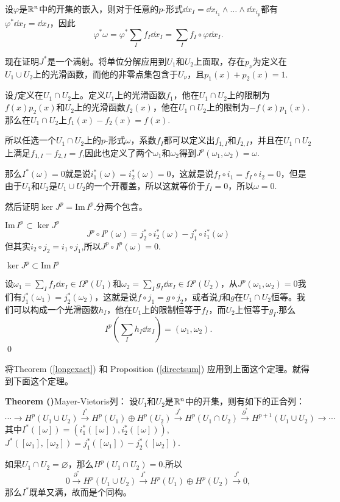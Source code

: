 \documentclass[9pt]{extbook}
\newcommand{\paracount}[1]{\refstepcounter{para}\textbf{#1 (\thepara)}}
\newcommand{\theo}{\paracount{Theorem}}
\newcommand{\pararef}[1]{(\ref{#1})}
\begin{document}
设$\varphi$是$\mathbb{R}^n$中的开集的嵌入，则对于任意的$p$-形式$\dd x_I=\dd x_{i_1}\wedge\dots\wedge\dd x_{i_p}$都有$\varphi^* \dd x_I =\dd x_I$，因此
\[
\varphi^*\omega=\varphi^*\sum_If_I\dd x_I=\sum_If_I\circ\varphi \dd x_I.
\]

现在证明$J^*$是一个满射。将单位分解应用到$U_1$和$U_2$上面取，存在$p_\nu$为定义在$U_1\cup U_2$上的光滑函数，而他的非零点集包含于$U_\nu$，且$p_1(x)+p_2(x)=1$.

设$f$定义在$U_1\cap U_2$上。定义$U_1$上的光滑函数$f_1$，他在$U_1\cap U_2$上的限制为$f(x)p_2(x)$和$U_2$上的光滑函数$f_2(x)$，他在$U_1\cap U_2$上的限制为$-f(x)p_1(x)$.那么在$U_1\cap U_2$上$f_1(x)-f_2(x)=f(x)$.

所以任选一个$U_1\cap U_2$上的$p$-形式$\omega$，系数$f_I$都可以定义出$f_{1,I}$和$f_{2,I}$，并且在$U_1\cap U_2$上满足$f_{1,I}-f_{2,I}=f$,因此也定义了两个$\omega_1$和$\omega_2$得到$J^p(\omega_1,\omega_2)=\omega$.

那么$I^*(\omega)=0$就是说$i_1^*(\omega)=i_2^*(\omega)=0$，这就是说$f_I\circ i_1=f_I\circ i_2=0$，但是由于$U_1$和$U_2$是$U_1\cup U_2$的一个开覆盖，所以这就等价于$f_I=0$，所以$\omega=0$.

然后证明$\ker J^p=\mathrm{Im}\, I^p$.分两个包含。

 $\mathrm{Im}\, I^p\subset \ker J^p$
\[
J^p\circ I^p(\omega)=j_2^*\circ i_2^*(\omega)-j_1^*\circ i_1^*(\omega)
\]
但其实$i_2\circ j_2=i_1\circ j_1$,所以$J^p\circ I^p(\omega)=0$.

 $\ker J^p\subset \mathrm{Im}\, I^p$

设$\omega_1=\sum_I f_I \dd x_I\in \Omega^p(U_1)$和$\omega_2=\sum_I g_I \dd x_I\in \Omega^p(U_2)$，从$J^p(\omega_1,\omega_2)=0$我们有$j_1^*(\omega_1)=j_2^*(\omega_2)$，这就是说$f\circ j_1=g\circ j_2$，或者说$f$和$g$在$U_1\cap U_2$恒等。我们可以构成一个光滑函数$h_I$，他在$U_1$上的限制恒等于$f_I$，而$U_2$上恒等于$g_I$.那么
\[
I^p\left(\sum_Ih_I\dd x_I\right)=(\omega_1,\omega_2).
\]\qed

将Theorem \pararef{longexact} 和 Proposition \pararef{directsum} 应用到上面这个定理。就得到下面这个定理。

\theo Mayer-Vietoris列：
设$U_1$和$U_2$是$\mathbb{R}^n$中的开集，则有如下的正合列：
\[
\cdots\to H^p(U_1\cup U_2)\xrightarrow{I^*}H^p(U_1)\oplus H^p(U_2)\xrightarrow{J^*}H^p(U_1\cap U_2)\xrightarrow{\partial^*}H^{p+1}(U_1\cup U_2)
\to \cdots
\]
其中$I^*([\omega])=(i_1^*([\omega]),i_2^*([\omega]))$,$J^*([\omega_1],[\omega_2])=j_1^*([\omega_1])-j_2^*([\omega_2])$.

如果$U_1\cap U_2=\varnothing$，那么$H^p(U_1\cap U_2)=0$.所以
\[
0\xrightarrow{\partial^*} H^p(U_1\cup U_2)\xrightarrow{I^*}H^p(U_1)\oplus H^p(U_2)\xrightarrow{J^*}0,
\]
那么$I^*$既单又满，故而是个同构。
\end{document}
